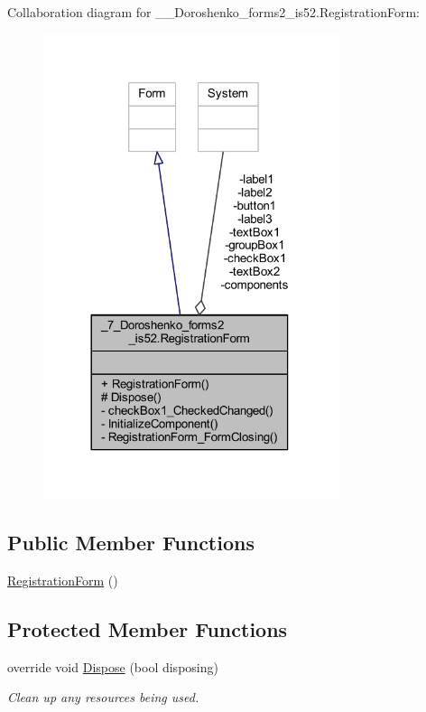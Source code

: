 Collaboration diagram for \+\_\+\_\+\+Doroshenko\+\_\+forms2\+\_\+is52.\+Registration\+Form\+:
\nopagebreak
\begin{figure}[H]
\begin{center}
\leavevmode
\includegraphics[width=245pt]{class__7___doroshenko__forms2__is52_1_1_registration_form__coll__graph}
\end{center}
\end{figure}
\subsection*{Public Member Functions}
\begin{DoxyCompactItemize}
\item 
\hyperlink{class__7___doroshenko__forms2__is52_1_1_registration_form_aba6aa95f4dc1f3d80399b15c141be71f}{Registration\+Form} ()
\end{DoxyCompactItemize}
\subsection*{Protected Member Functions}
\begin{DoxyCompactItemize}
\item 
override void \hyperlink{class__7___doroshenko__forms2__is52_1_1_registration_form_a9d9116080a88f2a3a51d7a0ee3c08d69}{Dispose} (bool disposing)
\begin{DoxyCompactList}\small\item\em Clean up any resources being used. \end{DoxyCompactList}\end{DoxyCompactItemize}
